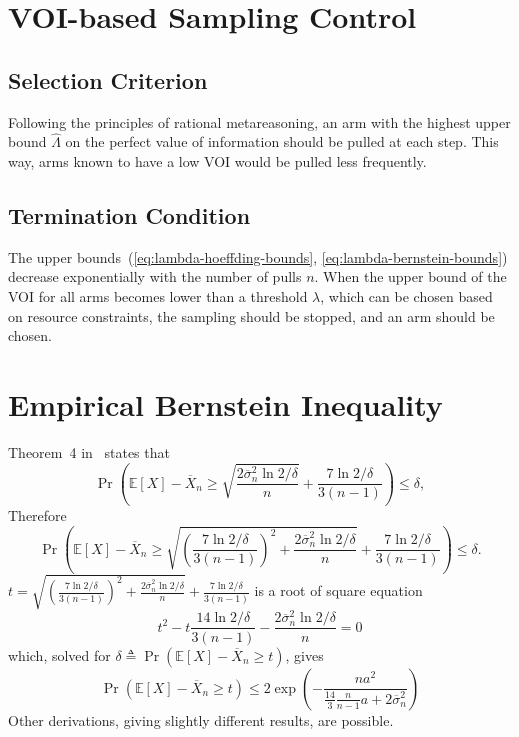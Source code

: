 \documentclass{article}
\newcommand {\IE} {\ensuremath {\mathbb{E}}}
\begin{document}
\section{VOI-based Sampling Control}

\subsection{Selection Criterion}

Following the principles of rational metareasoning, an arm with the highest upper bound $\hat
\Lambda$ on the perfect value of information should be pulled at each
step. This way, arms known to have a low VOI  would be pulled less frequently.

\subsection{Termination Condition}

The upper bounds~(\ref{eq:lambda-hoeffding-bounds}, \ref{eq:lambda-bernstein-bounds}) decrease exponentially with the
number of pulls $n$. When the upper bound of the VOI for all arms
becomes lower than a threshold $\lambda$, which can be chosen based on
resource constraints, the sampling should be stopped, and an arm should
be chosen.

\appendix

\section{Empirical Bernstein Inequality}
\label{app:deriv-conc-empbernstein}

Theorem~4 in~\cite{MaurerPontil.benrstein} states that
\[\Pr\left(\IE[X]-\overline X_n \ge \sqrt { \frac {2\overline\sigma_n^2 \ln 2/\delta} n } + \frac {7 \ln 2/\delta} {3(n-1)}\right)\le \delta,\]
Therefore
\[\Pr\left(\IE[X]-\overline X_n \ge \sqrt { \left(\frac {7 \ln 2/\delta} {3(n-1)}\right)^2+\frac {2\overline\sigma_n^2 \ln 2/\delta} n } + \frac {7 \ln 2/\delta} {3(n-1)}\right)\le
\delta.\]
$t=\sqrt { \left(\frac {7 \ln 2/\delta} {3(n-1)}\right)^2+\frac {2\overline\sigma_n^2 \ln 2/\delta} n } + \frac {7 \ln 2/\delta} {3(n-1)}$ is a root of
square equation
\[t^2-t\frac {14 \ln 2/\delta} {3(n-1)} -\frac {2\overline\sigma_n^2 \ln 2/\delta} n=0\]
which, solved for $\delta\triangleq\Pr(\IE[X]-\overline X_n\ge t)$,
gives
\[\Pr(\IE[X]-\overline X_n\ge t)\le 2\exp \left( - \frac {na^2} {\frac {14} {3} \frac {n} {n-1}a+2\overline\sigma_n^2}\right)\]
Other derivations, giving slightly different results, are possible.



\end{document}
